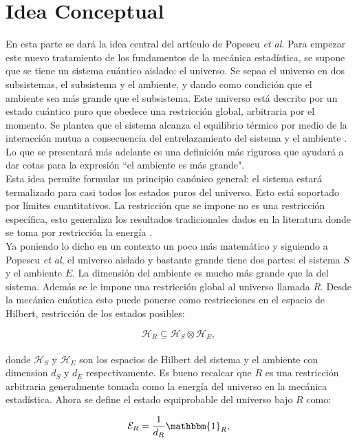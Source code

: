 \section{Idea Conceptual}
En esta parte se dará la idea central del artículo de Popescu \textit{et al}. Para empezar este nuevo tratamiento de los fundamentos de la mecánica estadística, se supone que se tiene un sistema cuántico aislado: el universo. Se sepaa el universo en dos subsistemas, el subsistema y el ambiente, y dando como condición que el ambiente sea más grande que el subsistema. Este universo está descrito por un estado cuántico puro que obedece una restricción global, arbitraria por el momento. Se plantea que el sistema alcanza el equilibrio térmico por medio de la interacción mutua a consecuencia del entrelazamiento del sistema y el ambiente  \cite{Popescu2006}. Lo que se presentará más adelante es una definición más rigurosa que ayudará a dar cotas para la expresión ``el ambiente es más grande".
\\
Esta idea permite formular un principio canónico general: el sistema estará termalizado para casi todos los estados puros del universo. Esto está soportado por límites cuantitativos. La restricción que se impone no es una restricción específica, esto generaliza los resultados tradicionales dados en la literatura donde se toma por restricción la energía \cite{KardarStat}.
\\
Ya poniendo lo dicho en un contexto un poco más matemático y siguiendo a Popescu \textit{et al}, el universo aislado y bastante grande tiene dos partes: el sistema $S$ y el ambiente $E$. La dimensión del ambiente es mucho más grande que la del sistema. Además se le impone una restricción global al universo llamada $R$. Desde la mecánica cuántica esto puede ponerse como restricciones en el espacio de Hilbert, restricción de los estados posibles:

\begin{equation}
\mathcal{H}_{R}\subseteq \mathcal{H}_{S}\otimes \mathcal{H}_{E},
\end{equation}
\\
donde $\mathcal{H}_{S}$ y $\mathcal{H}_{E}$ son los espacios de Hilbert del sistema y el ambiente con dimension $d_{S}$  y $d_{E}$ respectivamente. Es bueno recalcar que $R$ es una restricción arbitraria generalmente tomada como la energía del universo en la mecánica estadística. Ahora se define el estado equiprobable del universo bajo $R$ como:

\begin{equation}
\mathcal{E}_{R} = \frac{1}{d_{R}} \mathbbm{1}_{R},
\end{equation}

